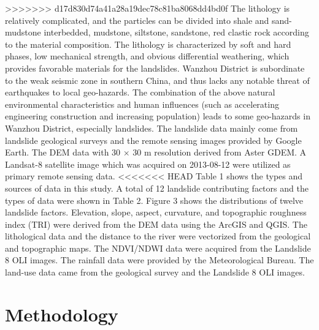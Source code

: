 \documentclass[a4paper,fleqn]{cas-sc}
\begin{document}
>>>>>>> d17d830d74a41a28a19dec78c81ba8068dd4bd0f
The lithology is relatively complicated, and the particles can be divided into shale and sand-mudstone interbedded, mudstone, siltstone, sandstone, red clastic rock according to the material composition. 
The lithology is characterized by soft and hard phases, low mechanical strength, and obvious differential weathering, which provides favorable materials for the landslides. 
Wanzhou District is subordinate to the weak seismic zone in southern China, and thus lacks any notable threat of earthquakes to local geo-hazards. 
The combination of the above natural environmental characteristics and human influences (such as accelerating engineering construction and increasing population) leads to some geo-hazards in Wanzhou District, especially landslides. 
The landslide data mainly come from landslide geological surveys and the remote sensing images provided by Google Earth. 
The DEM data with 30 $\times$ 30 m resolution derived from Aster GDEM. 
A Landsat-8 satellite image which was acquired on 2013-08-12 were utilized as primary remote sensing data. 
<<<<<<< HEAD
Table 1 shows the types and sources of data in this study. 
A total of 12 landslide contributing factors and the types of data were shown in Table 2. 
Figure 3 shows the distributions of twelve landslide factors. 
Elevation, slope, aspect, curvature, and topographic roughness index (TRI) were derived from the DEM data using the ArcGIS and QGIS. The lithological data and the distance to the river were vectorized from the geological and topographic maps. 
The NDVI/NDWI data were acquired from the Landslide 8 OLI images. 
The rainfall data were provided by the Meteorological Bureau. 
The land-use data came from the geological survey and the Landslide 8 OLI images.

\section{Methodology}
\end{document}
